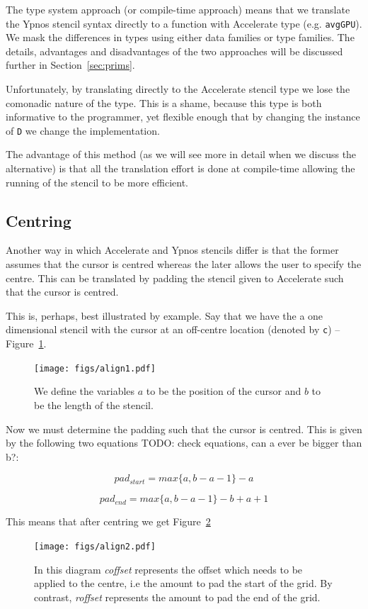 \documentclass[12pt,a4paper,oneside]{scrbook}
\begin{document}
The type system approach (or compile-time approach) means that we translate the
Ypnos stencil syntax directly to a function with Accelerate type
(e.g. \texttt{avgGPU}). We mask the differences in types using either data
families or type families. The details, advantages and disadvantages of the two
approaches will be discussed further in Section~\ref{sec:prims}.

Unfortunately, by translating directly to the Accelerate stencil type we lose
the comonadic nature of the type. This is a shame, because this type is both
informative to the programmer, yet flexible enough that by changing the instance
of \texttt{D} we change the implementation.

The advantage of this method (as we will see more in detail when we discuss the
alternative) is that all the translation effort is done at compile-time allowing
the running of the stencil to be more efficient.

\subsection{Centring}
\label{sec:centring}

Another way in which Accelerate and Ypnos stencils differ is that the former
assumes that the cursor is centred whereas the later allows the user to specify
the centre. This can be translated by padding the stencil given to Accelerate
such that the cursor is centred.

This is, perhaps, best illustrated by example. Say that we have the a one
dimensional stencil with the cursor at an off-centre location (denoted by
\texttt{c}) -- Figure~\ref{fig:cursor}.

\begin{figure}[tb]
  \centering
  \texttt{[image: figs/align1.pdf]}
  \caption{We define the variables $a$ to be the position of the cursor and $b$
    to be the length of the stencil.}
  \label{fig:cursor}
\end{figure}

Now we must determine the padding such that the cursor is centred. This is given
by the following two equations TODO: check equations, can a ever be bigger than b?:

\[ pad_{start} = max \{a, b-a-1\} - a \]

\[ pad_{end} = max \{a, b-a-1\} - b + a + 1 \]

This means that after centring we get Figure~\ref{fig:centredcursor}

\begin{figure}[tb]
  \centering
  \texttt{[image: figs/align2.pdf]}
  \caption{In this diagram \emph{coffset} represents the offset which needs to
    be applied to the centre, i.e the amount to pad the start of the grid. By
    contrast, \emph{roffset} represents the amount to pad the end of the grid.}
  \label{fig:centredcursor}
\end{figure}
\end{document}

